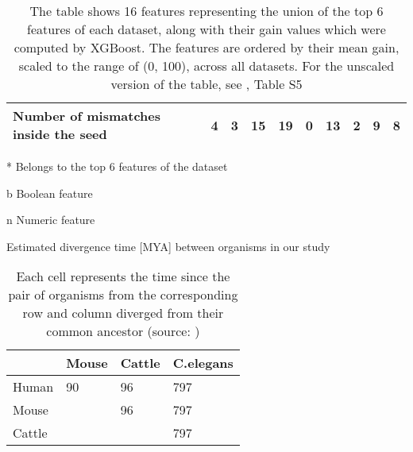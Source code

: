 \documentclass{bmcart}
\begin{document}
\begin{backmatter}
\begin{table}[h!]
\begin{threeparttable}
{\begin{tabular}{|l|l|l|l|l|l|l|l|l|l|}
\textbf{Number of mismatches inside the seed\tnote{n}}    & 4            & 3            & 15           & 19\tnote{*}          & 0           & 13          & 2           & 9           & 8             \\ \hline
\end{tabular}}
\begin{tablenotes}\footnotesize
\item[*] Belongs to the top 6 features of the dataset
\item[b] Boolean feature
\item[n] Numeric feature

\end{tablenotes}
 \end{threeparttable}
 \caption*{The table shows 16 features representing the union of the top 6 features of each dataset, along with their gain values which were computed by XGBoost. The features are ordered by their mean gain, scaled to the range of (0, 100), across all datasets. For the unscaled version of the table, see , Table S5}
\end{table}

\begin{table}[h!]
\caption{Estimated divergence time {[}MYA{]} between organisms in our study}
\label{tab:evolutiontime}
\centering
\begin{tabular}{|l|l|l|l|}
\hline
             & Mouse & Cattle & C.elegans \\ \hline
Human & 90  & 96         & 797                    \\ \hline
Mouse          &     & 96         & 797                    \\ \hline
Cattle   &     &            & 797                    \\ \hline
\end{tabular}
\caption*{Each cell represents the time since the pair of organisms from the corresponding row and column diverged from their common ancestor (source: \cite{kumar2017timetree})}
\end{table}


\end{backmatter}
\end{document}
